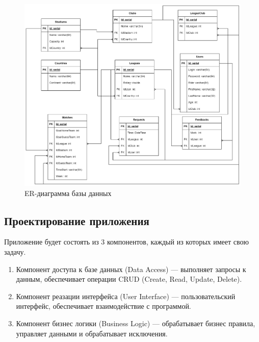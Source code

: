 \begin{figure}[h]
	\centering
	\includegraphics[height=0.5\textheight]{img/ERD.png}
	\caption{ER-диаграмма базы данных}
	\label{img:ERD}
\end{figure}
\clearpage
\subsection{Проектирование приложения}
Приложение будет состоять из 3 компонентов, каждый из которых имеет свою задачу.
\begin{enumerate}
	\item Компонент доступа к базе данных (Data Access) --- выполняет запросы к данным, обеспечивает операции CRUD (Create, Read, Update, Delete).
	\item Компонент реазации интерфейса (User Interface) --- пользовательский интерфейс, обеспечивает взаимодействие с программой.
	\item Компонент бизнес логики (Business Logic) --- обрабатывает бизнес правила, управляет данными и обрабатывает исключения.
\end{enumerate}

